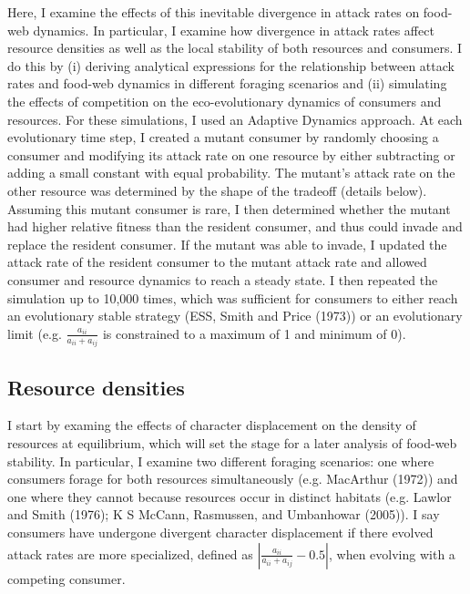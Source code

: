 \documentclass[11pt,]{article}
\begin{document}
Here, I examine the effects of this inevitable divergence in attack
rates on food-web dynamics. In particular, I examine how divergence in
attack rates affect resource densities as well as the local stability of
both resources and consumers. I do this by (i) deriving analytical
expressions for the relationship between attack rates and food-web
dynamics in different foraging scenarios and (ii) simulating the effects
of competition on the eco-evolutionary dynamics of consumers and
resources. For these simulations, I used an Adaptive Dynamics approach.
At each evolutionary time step, I created a mutant consumer by randomly
choosing a consumer and modifying its attack rate on one resource by
either subtracting or adding a small constant with equal probability.
The mutant's attack rate on the other resource was determined by the
shape of the tradeoff (details below). Assuming this mutant consumer is
rare, I then determined whether the mutant had higher relative fitness
than the resident consumer, and thus could invade and replace the
resident consumer. If the mutant was able to invade, I updated the
attack rate of the resident consumer to the mutant attack rate and
allowed consumer and resource dynamics to reach a steady state. I then
repeated the simulation up to 10,000 times, which was sufficient for
consumers to either reach an evolutionary stable strategy (ESS, Smith
and Price (1973)) or an evolutionary limit (e.g.
\(\frac{a_{ii}}{a_{ii}+a_{ij}}\) is constrained to a maximum of 1 and
minimum of 0).

\subsection{Resource densities}\label{resource-densities}

I start by examing the effects of character displacement on the density
of resources at equilibrium, which will set the stage for a later
analysis of food-web stability. In particular, I examine two different
foraging scenarios: one where consumers forage for both resources
simultaneously (e.g. MacArthur (1972)) and one where they cannot because
resources occur in distinct habitats (e.g. Lawlor and Smith (1976); K S
McCann, Rasmussen, and Umbanhowar (2005)). I say consumers have
undergone divergent character displacement if there evolved attack rates
are more specialized, defined as \(|\frac{a_{ii}}{a_{ii}+a_{ij}}-0.5|\),
when evolving with a competing consumer.
\end{document}
